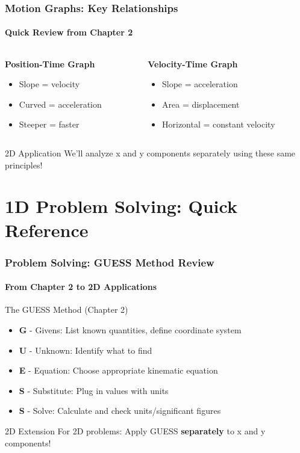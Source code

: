 \documentclass{beamer}
\begin{document}
\begin{frame}
\frametitle{Motion Graphs: Key Relationships}
\framesubtitle{Quick Review from Chapter 2}
\begin{columns}[T]
    \begin{column}{0.5\textwidth}
        \textbf{Position-Time Graph}
        \begin{itemize}
            \item \alert{Slope} = velocity
            \item Curved = acceleration
            \item Steeper = faster
        \end{itemize}
    \end{column}
    \begin{column}{0.5\textwidth}
        \textbf{Velocity-Time Graph}
        \begin{itemize}
            \item \alert{Slope} = acceleration
            \item \alert{Area} = displacement
            \item Horizontal = constant velocity
        \end{itemize}
    \end{column}
\end{columns}
\vspace{1em}
\begin{block}{2D Application}
We'll analyze x and y components separately using these same principles!
\end{block}
\end{frame}

\section{1D Problem Solving: Quick Reference}

\begin{frame}
\frametitle{Problem Solving: GUESS Method Review}
\framesubtitle{From Chapter 2 to 2D Applications}
\begin{block}{The GUESS Method (Chapter 2)}
\begin{itemize}
    \item \textbf{G} - \alert{Givens}: List known quantities, define coordinate system
    \item \textbf{U} - \alert{Unknown}: Identify what to find
    \item \textbf{E} - \alert{Equation}: Choose appropriate kinematic equation
    \item \textbf{S} - \alert{Substitute}: Plug in values with units
    \item \textbf{S} - \alert{Solve}: Calculate and check units/significant figures
\end{itemize}
\end{block}
\begin{alertblock}{2D Extension}
For 2D problems: Apply GUESS \textbf{separately} to x and y components!
\end{alertblock}
\end{frame}
\end{document}
